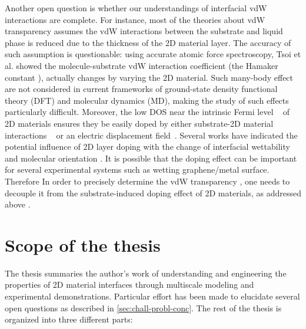 Another open question is whether our understandings of interfacial vdW
interactions are complete. For instance, most of the theories about
vdW transparency  assumes the
vdW interactions between the substrate and liquid phase is reduced due
to the thickness of the 2D material layer.
%
The accuracy of such assumption is questionable: using accurate atomic
force spectroscopy, Tsoi et al. showed the molecule-substrate vdW
interaction coefficient (the Hamaker constant ), actually changes by varying the 2D material.
%
Such many-body effect are not considered in current frameworks of
ground-state density functional theory (DFT) and molecular dynamics
(MD), making the study of such effects particularly difficult.
%
Moreover, the low DOS near the intrinsic Fermi level
~\cite{Das_Sarma_2011_electron_gr,Bhimanapati_2015_2D_rev} of 2D
materials ensures they be easily doped by either substrate-2D material
interactions
~\cite{Varchon_2007_doping,Giovannetti_2008_doping,Chen_2013_doping}
or an electric displacement
field~\cite{Das_2008_doping,Perera_2013_doping}. 
%
Several works have indicated the potential influence of 2D layer
doping with the change of interfacial wettability and molecular
orientation .
%
It is possible that the doping effect can be important for several
experimental systems such as wetting graphene\allowbreak{}/\allowbreak{}metal
surface. 
%
Therefore In order to precisely determine the vdW transparency , one
needs to decouple it from the substrate-induced doping effect of 2D
materials, as addressed above
\cite{Huttmann_2015_vdw_gr_doping,Muruganathan_2015_tunable_vdw_gr,Hong_2016_mechanism,Ashraf_2016_doping}.


\section{Scope of the thesis}
\label{sec:scope-thesis}

The thesis summaries the author's work of understanding and
engineering the properties of 2D material interfaces through
multiscale modeling and experimental demonstrations. Particular effort
has been made to elucidate several open questions as described in
\autoref{sec:chall-probl-conc}. The rest of the thesis is organized
into three different parts:

